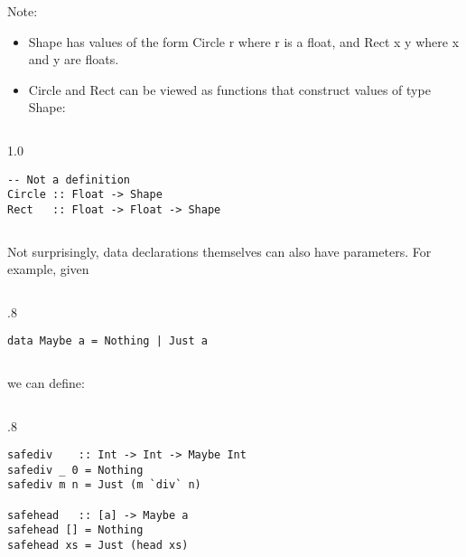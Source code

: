 \documentclass{beamer}
\newenvironment{codeblock}[1][.8]{%
\begin{columns}
\begin{column}{#1\linewidth}
\begin{exampleblock}{}}{%
\end{exampleblock}
\end{column}
\end{columns}}
\newenvironment{execblock}[1][.8]{%
\begin{columns}
\begin{column}{#1\linewidth}
\begin{block}{}}{%
\end{block}
\end{column}
\end{columns}}
\def\slideskip{\vskip 0.1in}
\begin{document}
\begin{frame}[fragile]

Note: 
\begin{itemize}
\item Shape has values of the form Circle r where r is 
a float, and Rect x y where x and y are floats. 
\item Circle and Rect can be viewed as functions that 
construct values of type Shape: 
\end{itemize}


\begin{execblock}[1.0]
\vspace{-2ex}
\begin{verbatim}
-- Not a definition
Circle :: Float -> Shape 
Rect   :: Float -> Float -> Shape
\end{verbatim}
\vspace{-2ex}
\end{execblock}


\end{frame}



\begin{frame}[fragile]
\large

Not surprisingly, data declarations themselves can 
also have parameters.  For example, given 
\slideskip

\begin{codeblock}
\vspace{-2ex}
\begin{verbatim}
data Maybe a = Nothing | Just a 
\end{verbatim}
\vspace{-2ex}
\end{codeblock}

\slideskip
we can define:
\slideskip

\begin{codeblock}
\vspace{-2ex}
\begin{verbatim}
safediv    :: Int -> Int -> Maybe Int 
safediv _ 0 = Nothing 
safediv m n = Just (m `div` n) 

safehead   :: [a] -> Maybe a 
safehead [] = Nothing 
safehead xs = Just (head xs) 
\end{verbatim}
\vspace{-2ex}
\end{codeblock}

\end{frame}
\end{document}
